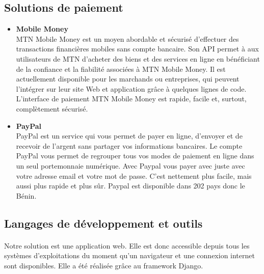   \subsection{Solutions de paiement}
      	\begin{itemize}
	  \item \textbf{Mobile Money}
	  \\MTN Mobile Money est un moyen abordable et sécurisé d’effectuer des transactions financières mobiles sans compte bancaire. Son API permet à aux utilisateurs de MTN d’acheter des biens et des services en ligne en bénéficiant de la confiance et la fiabilité associées à MTN Mobile Money. Il est actuellement disponible pour les marchands ou entreprises, qui peuvent l’intégrer sur leur site Web et application grâce à quelques lignes de code. L’interface de paiement MTN Mobile Money est rapide, facile et, surtout, complètement sécurisé. \cite{momo}
	  
	  \item \textbf{PayPal}
	  \\PayPal est un service qui vous permet de payer en ligne, d'envoyer et de recevoir de l'argent sans partager vos informations bancaires. Le compte PayPal vous permet de regrouper tous vos modes de paiement en ligne dans un seul portemonnaie numérique. Avec Paypal vous payer avec juste avec votre adresse email et votre mot de passe. C'est nettement plus facile, mais aussi plus rapide et plus sûr. Paypal est disponible dans 202 pays  donc le Bénin. \cite{paypal}
	\end{itemize}
	
  \subsection{Langages de développement et outils}

      \paragraph{}
	  Notre solution est une application web. Elle est donc accessible depuis tous les systèmes d'exploitations du moment qu'un navigateur et une connexion internet sont disponibles. Elle a \'et\'e r\'ealis\'ee gr\^ace au framework Django.

